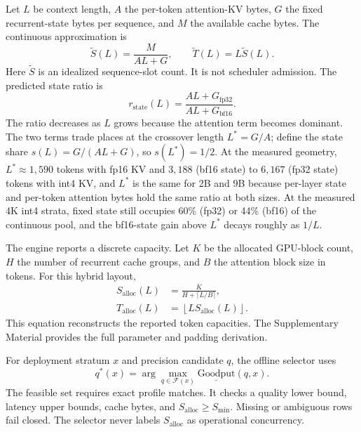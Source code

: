 \documentclass[conference,letterpaper,10pt]{IEEEtran}
\begin{document}
Let $L$ be context length, $A$ the per-token attention-KV bytes, $G$ the
fixed recurrent-state bytes per sequence, and $M$ the available cache bytes.
The continuous approximation is
\begin{equation}
  \widetilde{S}(L)=\frac{M}{A L+G}, \qquad
  \widetilde{T}(L)=L\widetilde{S}(L).
  \label{eq:continuous}
\end{equation}
Here $\widetilde{S}$ is an idealized sequence-slot count. It is not scheduler
admission. The predicted state ratio is
\begin{equation}
  r_{\mathrm{state}}(L)=
  \frac{A L+G_{\mathrm{fp32}}}{A L+G_{\mathrm{bf16}}}.
  \label{eq:rstate}
\end{equation}
The ratio decreases as $L$ grows because the attention term becomes dominant.
The two terms trade places at the crossover length $L^{\ast}=G/A$; define the
state share $s(L)=G/(AL+G)$, so $s(L^{\ast})=1/2$. At the measured geometry,
$L^{\ast}\approx1{,}590$ tokens with fp16 KV and $3{,}188$ (bf16 state) to
$6{,}167$ (fp32 state) tokens with int4 KV, and $L^{\ast}$ is the same for 2B
and 9B because per-layer state and per-token attention bytes hold the same
ratio at both sizes. At the measured 4K int4 strata, fixed state still occupies
60\% (fp32) or 44\% (bf16) of the continuous pool, and the bf16-state gain
above $L^{\ast}$ decays roughly as $1/L$.

The engine reports a discrete capacity. Let $K$ be the allocated GPU-block
count, $H$ the number of recurrent cache groups, and $B$ the attention block
size in tokens. For this hybrid layout,
\begin{equation}
  \begin{aligned}
  S_{\mathrm{alloc}}(L) &= \frac{K}{H+\lceil L/B\rceil},\\
  T_{\mathrm{alloc}}(L) &=
    \left\lfloor L S_{\mathrm{alloc}}(L)\right\rfloor.
  \end{aligned}
  \label{eq:discrete}
\end{equation}
This equation reconstructs the reported token capacities. The Supplementary
Material provides the full parameter and padding derivation.

For deployment stratum $x$ and precision candidate $q$, the offline selector
uses
\begin{equation}
q^*(x)=\arg\max_{q\in\mathcal{F}(x)}
\underline{\mathrm{Goodput}}(q,x).
\label{eq:selector}
\end{equation}
The feasible set requires exact profile matches. It checks a quality lower
bound, latency upper bounds, cache bytes, and
$S_{\mathrm{alloc}}\ge S_{\min}$. Missing or ambiguous rows fail closed.
The selector never labels $S_{\mathrm{alloc}}$ as operational concurrency.
\end{document}
